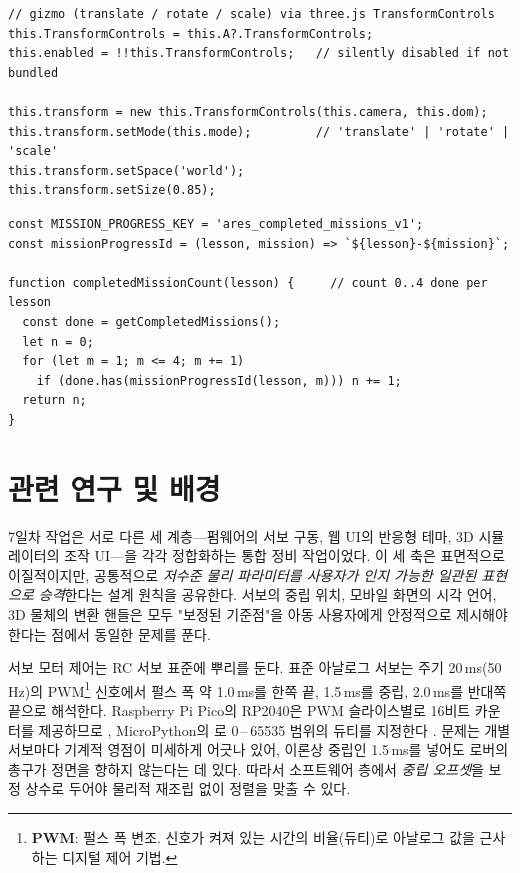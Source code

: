 \begin{verbatim}
// gizmo (translate / rotate / scale) via three.js TransformControls
this.TransformControls = this.A?.TransformControls;
this.enabled = !!this.TransformControls;   // silently disabled if not bundled

this.transform = new this.TransformControls(this.camera, this.dom);
this.transform.setMode(this.mode);         // 'translate' | 'rotate' | 'scale'
this.transform.setSpace('world');
this.transform.setSize(0.85);
\end{verbatim}

\begin{verbatim}
const MISSION_PROGRESS_KEY = 'ares_completed_missions_v1';
const missionProgressId = (lesson, mission) => `${lesson}-${mission}`;

function completedMissionCount(lesson) {     // count 0..4 done per lesson
  const done = getCompletedMissions();
  let n = 0;
  for (let m = 1; m <= 4; m += 1)
    if (done.has(missionProgressId(lesson, m))) n += 1;
  return n;
}
\end{verbatim}



\section{관련 연구 및 배경}

7일차 작업은 서로 다른 세 계층—펌웨어의 서보 구동, 웹 UI의 반응형 테마, 3D 시뮬레이터의 조작 UI—을 각각 정합화하는 통합 정비 작업이었다. 이 세 축은 표면적으로 이질적이지만, 공통적으로 \emph{저수준 물리 파라미터를 사용자가 인지 가능한 일관된 표현으로 승격}한다는 설계 원칙을 공유한다. 서보의 중립 위치, 모바일 화면의 시각 언어, 3D 물체의 변환 핸들은 모두 "보정된 기준점"을 아동 사용자에게 안정적으로 제시해야 한다는 점에서 동일한 문제를 푼다.

서보 모터 제어는 RC 서보 표준에 뿌리를 둔다. 표준 아날로그 서보는 주기 20\,ms(50\,Hz)의 PWM\footnote{\textbf{PWM}: 펄스 폭 변조. 신호가 켜져 있는 시간의 비율(듀티)로 아날로그 값을 근사하는 디지털 제어 기법.} 신호에서 펄스 폭 약 1.0\,ms를 한쪽 끝, 1.5\,ms를 중립, 2.0\,ms를 반대쪽 끝으로 해석한다. Raspberry Pi Pico의 RP2040은 PWM 슬라이스별로 16비트 카운터를 제공하므로 \cite{rp2040}, MicroPython의 로 0\,--\,65535 범위의 듀티를 지정한다 \cite{micropython}. 문제는 개별 서보마다 기계적 영점이 미세하게 어긋나 있어, 이론상 중립인 1.5\,ms를 넣어도 로버의 총구가 정면을 향하지 않는다는 데 있다. 따라서 소프트웨어 층에서 \emph{중립 오프셋}을 보정 상수로 두어야 물리적 재조립 없이 정렬을 맞출 수 있다.

